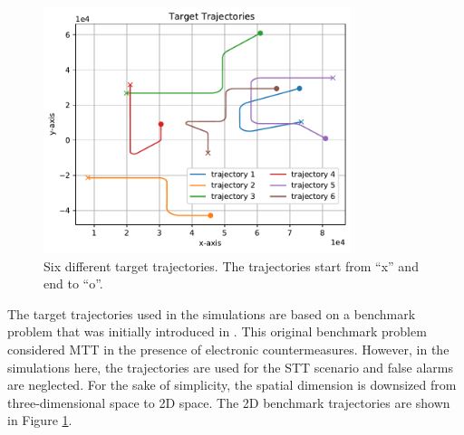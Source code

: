 \documentclass[english, 12pt, a4paper, elec, utf8, a-1b, online]{aaltothesis}
\begin{document}
\begin{figure}
    \centering
    \includegraphics[width=0.8\textwidth]{figures/benchmark/trajectories.pdf}
    \caption{Six different target trajectories. The trajectories start from ``x'' and end to ``o''.}
    \label{fig:benchmark_trajectories}
\end{figure}

The target trajectories used in the simulations are based on a benchmark problem that was initially introduced in \cite{Blair1998}.
This original benchmark problem considered MTT in the presence of electronic countermeasures.
However, in the simulations here, the trajectories are used for the STT scenario and false alarms are neglected.
For the sake of simplicity, the spatial dimension is downsized from three-dimensional space to 2D space.
The 2D benchmark trajectories are shown in Figure \ref{fig:benchmark_trajectories}.
\end{document}
